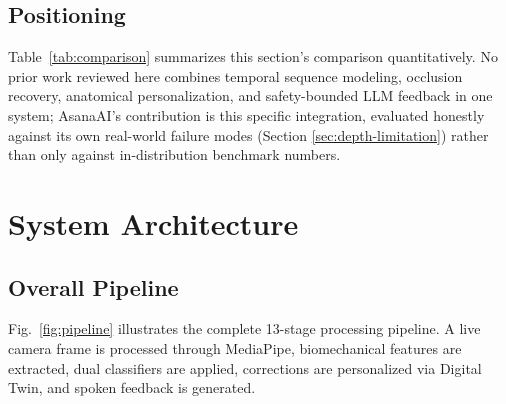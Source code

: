 \documentclass[conference]{IEEEtran}
\begin{document}
\subsection{Positioning}

Table~\ref{tab:comparison} summarizes this section's comparison quantitatively.
No prior work reviewed here combines temporal sequence modeling, occlusion
recovery, anatomical personalization, and safety-bounded LLM feedback in one
system; AsanaAI's contribution is this specific integration, evaluated
honestly against its own real-world failure modes (Section
\ref{sec:depth-limitation}) rather than only against in-distribution
benchmark numbers.

\section{System Architecture}
\label{sec:system}

\subsection{Overall Pipeline}

Fig.~\ref{fig:pipeline} illustrates the complete 13-stage processing pipeline. A live
camera frame is processed through MediaPipe, biomechanical features are extracted,
dual classifiers are applied, corrections are personalized via Digital Twin, and
spoken feedback is generated.
\end{document}
